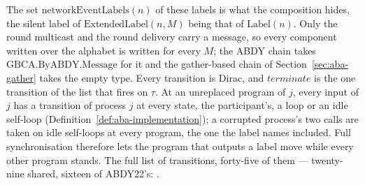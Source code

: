 \begin{definition}
  The set $\mathrm{networkEventLabels}(n)$ of these labels is what the composition hides, the silent label of $\mathrm{ExtendedLabel}(n, M)$ being that of $\mathrm{Label}(n)$.
  Only the round multicast and the round delivery carry a message, so every component written over the alphabet is written for every $M$; the ABDY chain takes $\mathrm{GBCA.ByABDY.Message}$ for it and the gather-based chain of Section~\ref{sec:aba-gather} takes the empty type.
  Every transition is Dirac, and $terminate$ is the one transition of the list that fires on $\tau$.
  At an unreplaced program of $j$, every input of $j$ has a transition of process $j$ at every state, the participant's, a loop or an idle self-loop (Definition~\ref{def:aba-implementation}); a corrupted process's two calls are taken on idle self-loops at every program, the one the label names included.
  Full synchronisation therefore lets the program that outputs a label move while every other program stands.
  The full list of transitions, forty-five of them --- twenty-nine shared, sixteen of ABDY22's: .
\end{definition}
